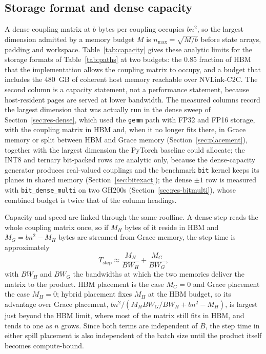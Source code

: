 \documentclass[11pt,a4paper]{article}
\newcommand{\code}[1]{\texttt{#1}}
\begin{document}
\subsection{Storage format and dense capacity}\label{sec:capacity}
A dense coupling matrix at $b$ bytes per coupling occupies $bn^2$, so the largest dimension admitted by a memory budget $M$ is $n_{\max}=\sqrt{M/b}$ before state arrays, padding and workspace. Table~\ref{tab:capacity} gives these analytic limits for the storage formats of Table~\ref{tab:paths} at two budgets: the 0.85 fraction of HBM that the implementation allows the coupling matrix to occupy, and a budget that includes the 480~GB of coherent host memory reachable over NVLink-C2C. The second column is a capacity statement, not a performance statement, because host-resident pages are served at lower bandwidth. The measured columns record the largest dimension that was actually run in the dense sweep of Section~\ref{sec:res-dense}, which used the \code{gemm} path with FP32 and FP16 storage, with the coupling matrix in HBM and, when it no longer fits there, in Grace memory or split between HBM and Grace memory (Section~\ref{sec:placement}), together with the largest dimension the PyTorch baseline could allocate; the INT8 and ternary bit-packed rows are analytic only, because the dense-capacity generator produces real-valued couplings and the benchmark \code{bit} kernel keeps its planes in shared memory (Section~\ref{sec:bitexact}); the dense $\pm1$ row is measured with \code{bit\_dense\_multi} on two GH200s (Section~\ref{sec:res-bitmulti}), whose combined budget is twice that of the column headings.

Capacity and speed are linked through the same roofline. A dense step reads the whole coupling matrix once, so if $M_H$ bytes of it reside in HBM and $M_G=bn^2-M_H$ bytes are streamed from Grace memory, the step time is approximately
\begin{equation}
 T_{\mathrm{step}}\approx \frac{M_H}{BW_H}+\frac{M_G}{BW_G},
 \label{eq:tier}
\end{equation}
with $BW_H$ and $BW_G$ the bandwidths at which the two memories deliver the matrix to the product. HBM placement is the case $M_G=0$ and Grace placement the case $M_H=0$; hybrid placement fixes $M_H$ at the HBM budget, so its advantage over Grace placement, $bn^2/(M_H BW_G/BW_H+bn^2-M_H)$, is largest just beyond the HBM limit, where most of the matrix still fits in HBM, and tends to one as $n$ grows. Since both terms are independent of $B$, the step time in either spill placement is also independent of the batch size until the product itself becomes compute-bound.
\end{document}
